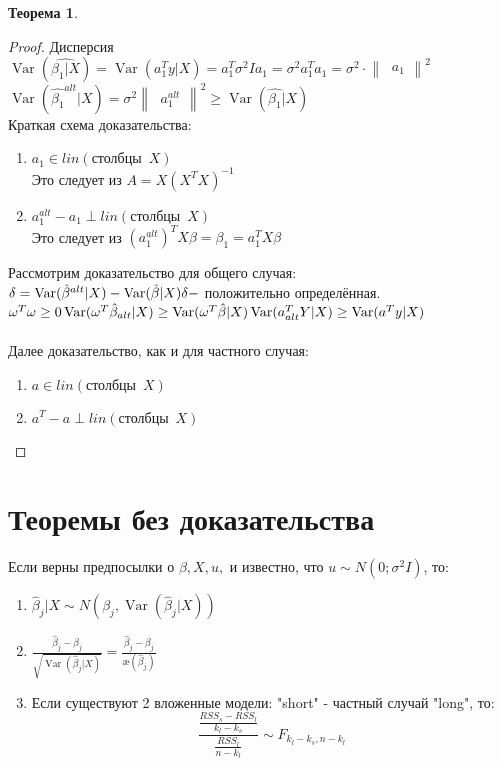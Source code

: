 \documentclass[12pt]{article} %
\theoremstyle{definition} %
\newtheorem{theorem}{Теорема}[section]
\DeclareMathOperator{\Var}{Var}
\begin{document}
\begin{theorem}
\begin{proof}
Дисперсия $\Var(\hat{\beta_1|X})=\Var(a_1^Ty|X)=a_1^T\sigma^2Ia_1=\sigma^2a_1^Ta_1=\sigma^2\cdot
\begin{Vmatrix}
  \ a_1
\end{Vmatrix}^2$\\
$\Var(\hat{\beta_1}^{alt}|X)=\sigma^2
\begin{Vmatrix}
  \ a_1^{alt}

\end{Vmatrix}^2 \geq \Var(\hat{\beta_1}|X)$\\

Краткая схема доказательства:
\begin{enumerate}
    \item $a_1 \in lin(\text{столбцы}\enspace X)$\\
Это следует из $A=X(X^TX)^{-1}$
    \item $a_1^{alt}-a_1 \perp lin(\text{столбцы} \enspace X)$\\
Это следует из $(a_1^{alt})^TX\beta=\beta_1=a_1^TX\beta$
\end{enumerate}
Рассмотрим доказательство для общего случая:\\
$\delta=\Var(\hat{\beta}^{alt}|X)-\Var(\hat{\beta}|X)\\
\delta - $ положительно определённая.\\
$\omega^T\omega \geq 0 \\
\Var(\omega^T \hat{\beta}_{alt}|X) \geq \Var(\omega^T \hat{\beta}|X)\\
\Var(a_{alt}^TY|X) \geq \Var(a^Ty|X)$\\\\
Далее доказательство, как и для частного случая:
\begin{enumerate}
    \item $a \in lin(\text{столбцы} \enspace X)$
    \item $a^T-a \perp lin(\text{столбцы} \enspace X)$
\end{enumerate}
\end{proof}
\end{theorem}

\section{Теоремы без доказательства}
Если верны предпосылки о $\beta, X, u,$ и известно, что $u \sim N(0;\sigma^2I)$, то: 
\begin{enumerate}
    \item $\hat{\beta}_j|X \sim N(\beta_j, \Var(\hat{\beta}_j|X))$
    \item $\frac{\hat{\beta}_j-\beta_j}{\sqrt{\Var(\hat{\beta}_j|X)}}=\frac{\hat{\beta}_j-\beta_j}{\text{\ae}(\hat{\beta}_j)}$
    \item Если существуют 2 вложенные модели: "short" - частный случай "long", то:\\
\[ \frac{\frac{{RSS}_s-RSS_l}{k_l-k_s}}  {\frac{RSS_l}{n-k_l}} \sim F_{k_l-k_s,n-k_l}\]
\end{enumerate}
\end{document}
